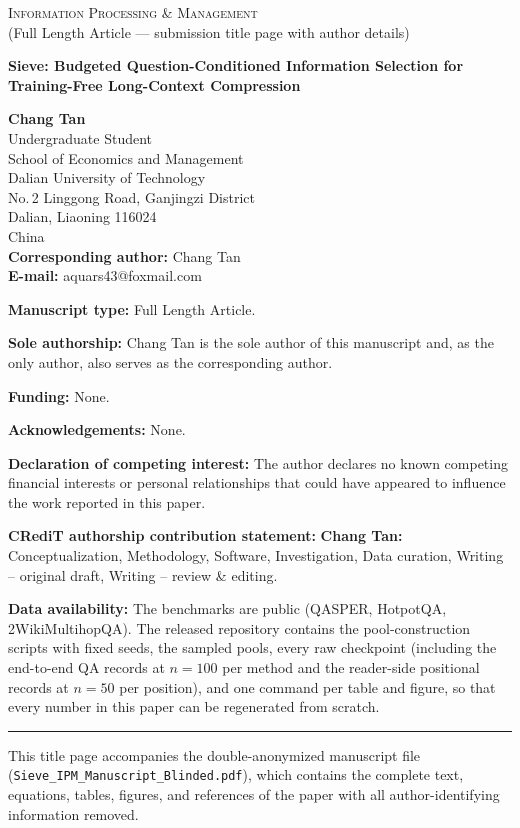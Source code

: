 \documentclass[12pt]{article}
\newcommand{\PaperTitle}{Sieve: Budgeted Question-Conditioned
Information Selection for Training-Free Long-Context Compression}
\begin{document}
\begin{center}
{\large\scshape Information Processing \& Management}\\[0.25em]
{\normalsize (Full Length Article --- submission title page with author details)}
\end{center}

\vspace{0.9em}

\begin{center}
{\LARGE\bfseries \PaperTitle{}}
\end{center}

\vspace{1.1em}

\begin{center}
{\large\bfseries Chang Tan}\\[0.5em]
Undergraduate Student\\
School of Economics and Management\\
Dalian University of Technology\\
No.\,2 Linggong Road, Ganjingzi District\\
Dalian, Liaoning 116024\\
China\\[0.7em]
\textbf{Corresponding author:} Chang Tan\\
\textbf{E-mail:} aquars43@foxmail.com
\end{center}

\vspace{1.1em}

\noindent\textbf{Manuscript type:} Full Length Article.

\noindent\textbf{Sole authorship:} Chang Tan is the sole author of this
manuscript and, as the only author, also serves as the corresponding
author.

\noindent\textbf{Funding:} None.

\noindent\textbf{Acknowledgements:} None.

\noindent\textbf{Declaration of competing interest:} The author declares
no known competing financial interests or personal relationships that
could have appeared to influence the work reported in this paper.

\noindent\textbf{CRediT authorship contribution statement:}
\textbf{Chang Tan:} Conceptualization, Methodology, Software,
Investigation, Data curation, Writing -- original draft, Writing -- review
\& editing.

\noindent\textbf{Data availability:} The benchmarks are public (QASPER,
HotpotQA, 2WikiMultihopQA). The released repository contains the
pool-construction scripts with fixed seeds, the sampled pools, every raw
checkpoint (including the end-to-end QA records at $n{=}100$ per method
and the reader-side positional records at $n{=}50$ per position), and one
command per table and figure, so that every number in this paper can be
regenerated from scratch.

\noindent\rule{\textwidth}{0.4pt}
{\footnotesize This title page accompanies the double-anonymized manuscript
file (\texttt{Sieve\_IPM\_Manuscript\_Blinded.pdf}), which contains the
complete text, equations, tables, figures, and references of the paper with
all author-identifying information removed.}
\end{document}
